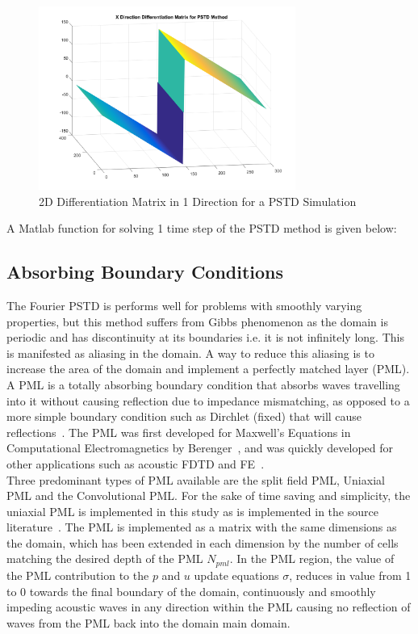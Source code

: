 \begin{figure}[H]
\centering
  \includegraphics[width=0.75\textwidth]{./graphics/pstd2ddiffmatrix.png}
  \caption{2D Differentiation Matrix in 1 Direction for a PSTD Simulation}
\end{figure}

A Matlab function for solving 1 time step of the PSTD method is given below:\\

%

\subsection{Absorbing Boundary Conditions}
The Fourier PSTD is performs well for problems with smoothly varying properties, but this method suffers from Gibbs phenomenon as the domain is periodic and has discontinuity at its boundaries i.e. it is not infinitely long. This is manifested as aliasing in the domain. A way to reduce this aliasing is to increase the area of the domain and implement a perfectly matched layer (PML). A PML is a totally absorbing boundary condition that absorbs waves travelling into it without causing reflection due to impedance mismatching, as opposed to a more simple boundary condition such as Dirchlet (fixed) that will cause reflections~\cite{Rumpf2012a}. The PML was first developed for Maxwell's Equations in Computational Electromagnetics by Berenger~\cite{Berenger1994}, and was quickly developed for other applications such as acoustic FDTD and FE~\cite{Liu1997}.\\

Three predominant types of PML available are the split field PML, Uniaxial PML and the Convolutional PML. For the sake of time saving and simplicity, the uniaxial PML is implemented in this study as is implemented in the source literature~\cite{Angus2010}. The PML is implemented as a matrix with the same dimensions as the domain, which has been extended in each dimension by the number of cells matching the desired depth of the PML $N_{pml}$. In the PML region, the value of the PML contribution to the $p$ and $u$ update equations $\sigma$, reduces in value from 1 to 0 towards the final boundary of the domain, continuously and smoothly impeding acoustic waves in any direction within the PML causing no reflection of waves from the PML back into the domain main domain.\\
 
